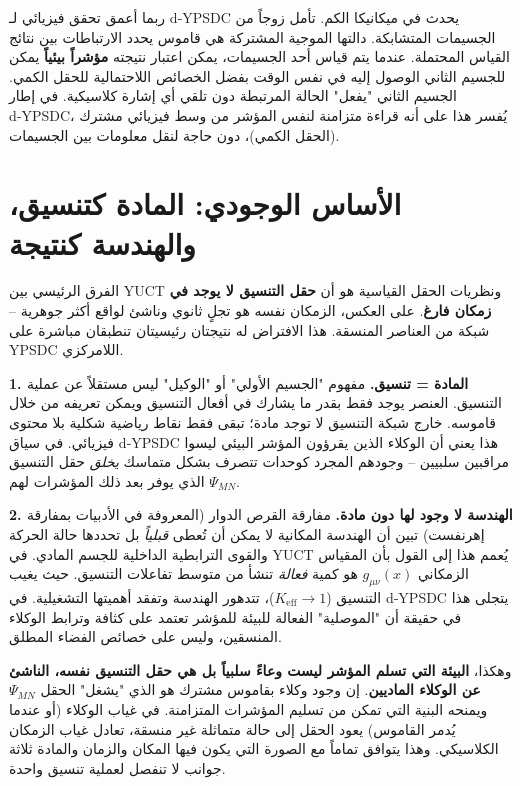 \documentclass[11pt,a4paper]{article}
\begin{document}
	ربما أعمق تحقق فيزيائي لـ d‑YPSDC يحدث في ميكانيكا الكم. تأمل زوجاً من الجسيمات المتشابكة. دالتها الموجية المشتركة هي قاموس يحدد الارتباطات بين نتائج القياس المحتملة. عندما يتم قياس أحد الجسيمات، يمكن اعتبار نتيجته \textbf{مؤشراً بيئياً} يمكن للجسيم الثاني الوصول إليه في نفس الوقت بفضل الخصائص اللاحتمالية للحقل الكمي. الجسيم الثاني "يفعل" الحالة المرتبطة دون تلقي أي إشارة كلاسيكية. في إطار d‑YPSDC، يُفسر هذا على أنه قراءة متزامنة لنفس المؤشر من وسط فيزيائي مشترك (الحقل الكمي)، دون حاجة لنقل معلومات بين الجسيمات.
	
	\section{الأساس الوجودي: المادة كتنسيق، والهندسة كنتيجة}
	
	الفرق الرئيسي بين YUCT ونظريات الحقل القياسية هو أن \textbf{حقل التنسيق لا يوجد في زمكان فارغ}. على العكس، الزمكان نفسه هو تجلٍ ثانوي وناشئ لواقع أكثر جوهرية – شبكة من العناصر المنسقة. هذا الافتراض له نتيجتان رئيسيتان تنطبقان مباشرة على YPSDC اللامركزي.
	
	\textbf{1. المادة = تنسيق.} مفهوم "الجسيم الأولي" أو "الوكيل" ليس مستقلاً عن عملية التنسيق. العنصر يوجد فقط بقدر ما يشارك في أفعال التنسيق ويمكن تعريفه من خلال قاموسه. خارج شبكة التنسيق لا توجد مادة؛ تبقى فقط نقاط رياضية شكلية بلا محتوى فيزيائي. في سياق d‑YPSDC هذا يعني أن الوكلاء الذين يقرؤون المؤشر البيئي ليسوا مراقبين سلبيين – وجودهم المجرد كوحدات تتصرف بشكل متماسك \emph{يخلق} حقل التنسيق \(\Psi_{MN}\) الذي يوفر بعد ذلك المؤشرات لهم.
	
	\textbf{2. الهندسة لا وجود لها دون مادة.} مفارقة القرص الدوار (المعروفة في الأدبيات بمفارقة إهرنفست) تبين أن الهندسة المكانية لا يمكن أن تُعطى \emph{قبلياً} بل تحددها حالة الحركة والقوى الترابطية الداخلية للجسم المادي. في YUCT يُعمم هذا إلى القول بأن المقياس الزمكاني \(g_{\mu\nu}(x)\) هو كمية \emph{فعالة} تنشأ من متوسط تفاعلات التنسيق. حيث يغيب التنسيق (\(K_{\mathrm{eff}} \to 1\))، تتدهور الهندسة وتفقد أهميتها التشغيلية. في d‑YPSDC يتجلى هذا في حقيقة أن "الموصلية" الفعالة للبيئة للمؤشر تعتمد على كثافة وترابط الوكلاء المنسقين، وليس على خصائص الفضاء المطلق.
	
	وهكذا، \textbf{البيئة التي تسلم المؤشر ليست وعاءً سلبياً بل هي حقل التنسيق نفسه، الناشئ عن الوكلاء الماديين}. إن وجود وكلاء بقاموس مشترك هو الذي "يشغل" الحقل \(\Psi_{MN}\) ويمنحه البنية التي تمكن من تسليم المؤشرات المتزامنة. في غياب الوكلاء (أو عندما يُدمر القاموس) يعود الحقل إلى حالة متماثلة غير منسقة، تعادل غياب الزمكان الكلاسيكي. وهذا يتوافق تماماً مع الصورة التي يكون فيها المكان والزمان والمادة ثلاثة جوانب لا تنفصل لعملية تنسيق واحدة.
	
\end{document}

